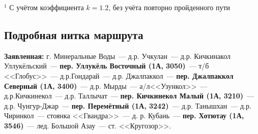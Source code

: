 \begin{table}[h!]
\end{table}
\footnotesize{$^1$ С учётом коэффициента $k=1.2$, без учёта повторно пройденного пути}
\normalsize

\subsection{Подробная нитка маршрута}
\textbf{Заявленная:} г. Минеральные Воды~--- д.р. Учкулан~--- д.р. Кичкинакол Уллукёльский~--- \textbf{пер. Уллукёль Восточный (1А, 3050)}~--- т/б <<Глобус>>~--- д.р.Гондарай~--- д.р. Джалпаккол~--- \textbf{пер. Джалпаккол Северный (1А, 3400)}~--- д.р. Мырды~--- а/л<<Узункол>>~--- д.р.Кичкинекол~--- д.р. Таллычат~--- \textbf{пер. Кичкинекол Малый (1А, 3210)}~--- д.р. Чунгур-Джар~--- \textbf{пер. Перемётный (1А, 3242)}~--- д.р. Танышхан~--- д.р. Чиринкол~--- стоянка <<Гвандра>>~--- д. р. Кубань~--- \textbf{пер. Хотютау (1А, 3546)}~--- лед. Большой Азау~--- ст. <<Кругозор>>.

